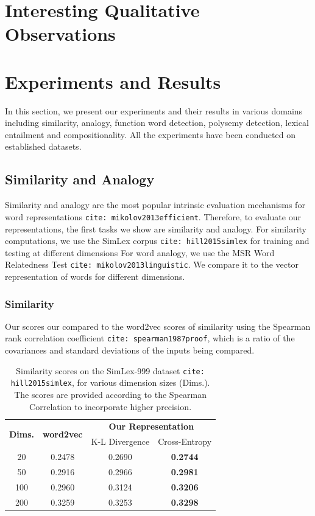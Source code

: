 \documentclass[11pt]{book}
\newcommand{\citep}[1]{\texttt{cite: #1}}
\begin{document}
\section{Interesting Qualitative Observations}
\label{sec: observations}

\section{Experiments and Results}
\label{sec: results}

In this section, we present our experiments and their results in various
domains including similarity, analogy, function word detection, polysemy
detection, lexical entailment and compositionality. All the experiments have
been conducted on established datasets.

\subsection{Similarity and Analogy}
\label{ssec: sim-anal}

Similarity and analogy are the most popular intrinsic evaluation mechanisms for
word representations \citep{mikolov2013efficient}. Therefore, to evaluate our
representations, the first tasks we show are similarity and analogy. For
similarity computations, we use the SimLex corpus \citep{hill2015simlex} for
training and testing at different dimensions For word analogy, we use the MSR
Word Relatedness Test \citep{mikolov2013linguistic}. We compare it to the
vector representation of words for different dimensions.

\subsubsection{Similarity} 

Our scores our compared to the word2vec scores of similarity using the Spearman
rank correlation coefficient \citep{spearman1987proof}, which is a ratio of the
covariances and standard deviations of the inputs being compared. 

\begin{table}[]
    \centering
    {\small
    \begin{tabular}{c|c|cc}
        \multirow{2}{*}{\bf Dims.}   & \multirow{2}{*}{\bf word2vec} & \multicolumn{2}{c}{\bf Our Representation} \\ \cline{3-4}
                            &                               & K-L Divergence & Cross-Entropy \\\hline
        20  &   0.2478   & 0.2690 & \bf 0.2744    \\
        50  &   0.2916   & 0.2966 & \bf 0.2981    \\
        100 &   0.2960   & 0.3124 & \bf 0.3206    \\
        200 &   0.3259   & 0.3253 & \bf 0.3298    
    \end{tabular}
    }
    \caption{Similarity scores on the SimLex-999 dataset \citep{hill2015simlex}, for various dimension sizes (Dims.). The scores are provided according to the Spearman Correlation to incorporate higher precision.}
    \label{tab: similarity scores}
\end{table}
\end{document}
